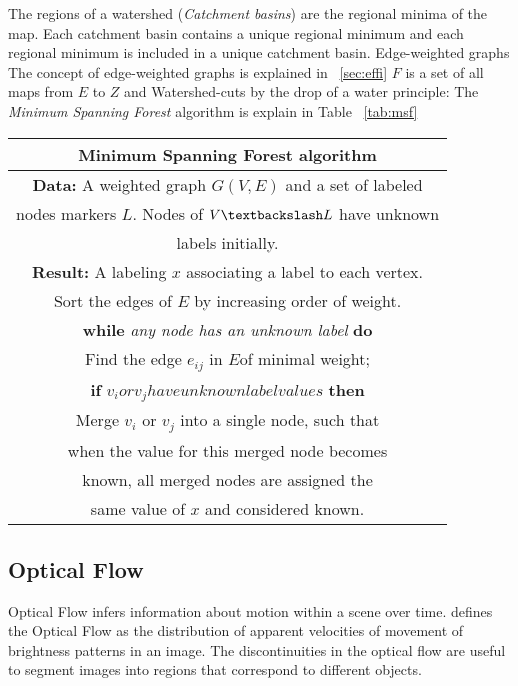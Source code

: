 The regions of a watershed (\textit{Catchment basins}) are the regional minima of the map. Each catchment basin contains a unique regional minimum and each regional minimum is included in a unique catchment basin.
Edge-weighted graphs
The concept of edge-weighted graphs is explained in ~\ref{sec:effi}
\(F\) is a set of all maps from \(E\) to \(Z\) and  
Watershed-cuts by the drop of a water principle:
The \textit{Minimum Spanning Forest} algorithm is explain in Table ~\ref{tab:msf}
\begin{center}
 \begin{tabular}{| c |}
 \hline
 Minimum Spanning Forest algorithm \\
 \hline
 \textbf{Data:} A weighted graph \(G(V,E)\) and a set of labeled \\
  nodes markers \(L\). Nodes of \(V \textbackslash L \) have unknown \\
  labels initially.\\
 \textbf{Result:} A labeling \(x\) associating a label to each vertex. \\
Sort the edges of \(E\) by increasing order of weight.\\
 \textbf{while} \textit{any node has an unknown label} \textbf{do} \\
 Find the edge \(e_{ij}\) in \(E\)of minimal weight; \\
 \textbf{if} \(v_{i} or v_{j} have unknown label values\) \textbf{then} \\
  Merge \(v_{i}\) or \(v_{j}\) into a single node, such that\\
  when the value for this merged node becomes\\
  known, all merged nodes are assigned the\\
  same value of \(x\) and considered known.\\ 
 \hline
 \end{tabular}
 \label{tab:msf}
\end{center}


\subsection{Optical Flow}
Optical Flow infers information about motion within a scene over time. \textcite{horn1981determining} defines the Optical Flow as the distribution of apparent velocities of movement of brightness patterns in an image. The discontinuities in the optical flow are useful to segment images into regions that correspond to different objects. 

